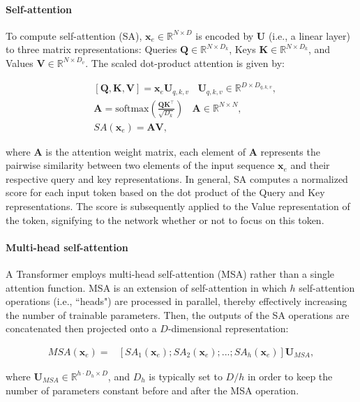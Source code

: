 \documentclass[times,twocolumn,final]{elsarticle}
\begin{document}
\paragraph{Self-attention} To compute self-attention (SA), $\mathbf{x}_e\in\mathbb{R}^{N\times D}$ is encoded by $\mathbf{U}$ (i.e., a linear layer) to three matrix representations: Queries $\mathbf{Q}\in\mathbb{R}^{N\times D_k}$, Keys $\mathbf{K}\in\mathbb{R}^{N\times D_k}$, and Values $\mathbf{V}\in\mathbb{R}^{N\times D_v}$. The scaled dot-product attention is given by:
\begin{linenomath}
\begin{equation}
\begin{split}
     &[\mathbf{Q},\mathbf{K},\mathbf{V}] = \mathbf{x}_e\mathbf{U}_{q,k,v} \ \ \ \ \mathbf{U}_{q,k,v}\in\mathbb{R}^{D\times D_{q,k,v}},\\
     &\mathbf{A} = \text{softmax}(\frac{\mathbf{Q}\mathbf{K}^\top}{\sqrt{D_k}}) \ \ \ \ \mathbf{A}\in\mathbb{R}^{N\times N},\\
     &SA(\mathbf{x}_e)=\mathbf{AV},
\end{split}
\end{equation}
\end{linenomath}
where $\mathbf{A}$ is the attention weight matrix, each element of $\mathbf{A}$ represents the pairwise similarity between two elements of the input sequence $\mathbf{x}_e$ and their respective query and key representations. In general, SA computes a normalized score for each input token based on the dot product of the Query and Key representations. The score is subsequently applied to the Value representation of the token, signifying to the network whether or not to focus on this token.

\paragraph{Multi-head self-attention} A Transformer employs multi-head self-attention (MSA) rather than a single attention function. MSA is an extension of self-attention in which $h$ self-attention operations (i.e., ``heads") are processed in parallel, thereby effectively increasing the number of trainable parameters. Then, the outputs of the SA operations are concatenated then projected onto a $D$-dimensional representation:
\begin{linenomath}
\begin{equation}
\begin{split}
    MSA(\mathbf{x}_e) = &[SA_1(\mathbf{x}_e);SA_2(\mathbf{x}_e);...;SA_h(\mathbf{x}_e)]\mathbf{U}_{MSA},
\end{split}
\end{equation}
\end{linenomath}
where $\mathbf{U}_{MSA}\in\mathbb{R}^{h\cdot D_h\times D}$, and $D_h$ is typically set to $D/h$ in order to keep the number of parameters constant before and after the MSA operation.
\end{document}
